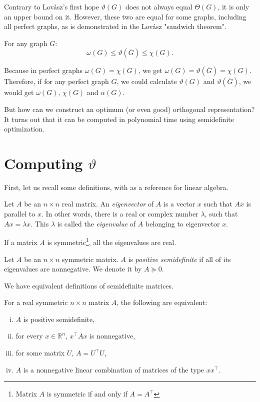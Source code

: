 Contrary to Lovász's first hope \cite{Lovasz1979} $\vartheta(G)$ does not always equal $\Theta(G)$, it is only an upper bound on it. However, these two are equal for some graphs, including all perfect graphs, as is demonstrated in the Lovász "sandwich theorem".

\begin{theorem}
  \label{thm:sandwich}
  For any graph $G$:
  $$ \omega(G) \leq \vartheta(\overline{G}) \leq \chi(G).$$
\end{theorem}

Because in perfect graphs $\omega(G) = \chi(G)$, we get $\omega(G) = \vartheta(\overline{G}) = \chi(G)$. Therefore, if for any perfect graph $G$, we could calculate $\vartheta(G)$ and $\vartheta(\overline{G})$, we would get $\omega(G)$, $\chi(G)$ and $\alpha(G)$.

But how can we construct an optimum (or even good) orthogonal representation? It turns out that it can be computed in polynomial time using semidefinite optimization.

\section{Computing \boldmath$\vartheta$}
\label{sec:computingTheta}

First, let us recall some definitions, with \cite{gilbertstrang2020} as a reference for linear algebra.

\begin{defn}
  Let $A$ be an $n \times n$ real matrix. An \emph{eigenvector} of $A$ is a vector $x$ such that $Ax$ is parallel to $x$. In other words, there is a real or complex number $\lambda$, such that $Ax = \lambda x$. This $\lambda$ is called the \emph{eigenvalue} of $A$ belonging to eigenvector $x$.
\end{defn}

If a matrix $A$ is symmetric\footnote{Matrix $A$ is symmetric if and only if $A = A^\intercal$}, all the eigenvalues are real.

\begin{defn}
  Let $A$ be an $n \times n$ symmetric matrix. $A$ is \emph{positive semidefinite} if all of its eigenvalues are nonnegative. We denote it by $A \succeq 0$.
\end{defn}

We have equivalent definitions of semidefinite matrices.
\begin{theorem}
  For a real symmetric $n \times n$ matrix $A$, the following are equivalent:
  \begin{enumerate}[(i)]
    \item $A$ is positive semidefinite,
    \item \label{en:ei2} for every $x \in \mathbb{R}^n$, $x^\intercal Ax$ is nonnegative,
    \item for some matrix $U$, $A = U^\intercal U$,
    \item $A$ is a nonnegative linear combination of matrices of the type $xx^\intercal$.
  \end{enumerate}
\end{theorem}

